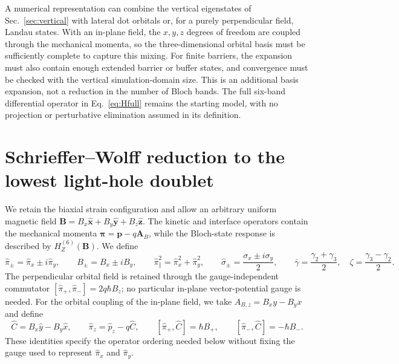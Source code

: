 \documentclass[10pt,letterpaper]{article}
\newcommand{\ket}[1]{\lvert #1\rangle}
\newcommand{\mel}[3]{\langle #1\vert #2\vert #3\rangle}
\newcommand{\hc}{\mathrm{h.c.}}
\newcommand{\ep}{\epsilon}
\newcommand{\qq}{q_{\mathrm k}}
\newcommand{\LH}{\mathrm{LH}}
\newcommand{\SO}{\mathrm{SO}}
\begin{document}
A numerical representation can combine the vertical eigenstates of Sec.~\ref{sec:vertical} with lateral dot orbitals or, for a purely perpendicular field, Landau states. With an in-plane field, the $x,y,z$ degrees of freedom are coupled through the mechanical momenta, so the three-dimensional orbital basis must be sufficiently complete to capture this mixing. For finite barriers, the expansion must also contain enough extended barrier or buffer states, and convergence must be checked with the vertical simulation-domain size. This is an additional basis expansion, not a reduction in the number of Bloch bands. The full six-band differential operator in Eq.~\eqref{eq:Hfull} remains the starting model, with no projection or perturbative elimination assumed in its definition.














\section{Schrieffer--Wolff reduction to the lowest light-hole doublet}
\label{sec:swt6-inplane}

We retain the biaxial strain configuration and allow an arbitrary uniform
magnetic field $\bm B=B_x\hat{\bm x}+B_y\hat{\bm y}+B_z\hat{\bm z}$.
The kinetic and interface operators contain the mechanical momenta
$\bm\pi=\bm p-q\bm A_B$, while the Bloch-state response is described by
$H_Z^{(6)}(\bm B)$. We define
\begin{equation}
 \hat\pi_\pm=\hat\pi_x\pm i\hat\pi_y,\qquad
 B_\pm=B_x\pm iB_y,\qquad
 \hat\pi_\parallel^2=\hat\pi_x^2+\hat\pi_y^2,\qquad
 \hat\sigma_\pm=\frac{\sigma_x\pm i\sigma_y}{2},\qquad
 \bar\gamma=\frac{\gamma_2+\gamma_3}{2},\quad
 \zeta=\frac{\gamma_3-\gamma_2}{2}.
 \label{eq:swt6-notation}
\end{equation}
The perpendicular orbital field is retained through the gauge-independent
commutator $[\hat\pi_+,\hat\pi_-]=2q\hbar B_z$; no particular in-plane
vector-potential gauge is needed. For the orbital coupling of the in-plane
field, we take $A_{B,z}=B_xy-B_yx$ and define
\begin{equation}
 \hat C=B_x\hat y-B_y\hat x,\qquad
 \hat\pi_z=\hat p_z-q\hat C,\qquad
 [\hat\pi_+,\hat C]=\hbar B_+,\qquad
 [\hat\pi_-,\hat C]=-\hbar B_-.
 \label{eq:swt6-orb-notation}
\end{equation}
These identities specify the operator ordering needed below without fixing
the gauge used to represent $\hat\pi_x$ and $\hat\pi_y$.
\end{document}
